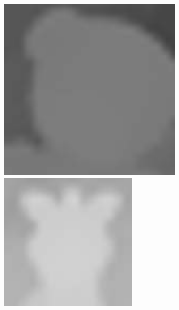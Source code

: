 \documentclass{bjtu-bachelor-thesis}
\begin{document}
\begin{figure}[!htbp]
\begin{minipage}[b]{\linewidth}
{\begin{minipage}[b]{0.085\linewidth}
      \includegraphics[width=\linewidth]{figures/doll/bicubic_0.pdf}\vspace{2pt}
      \includegraphics[width=\linewidth]{figures/doll/bicubic_1.pdf}

\end{minipage}}
\end{minipage}
\end{figure}
\end{document}
